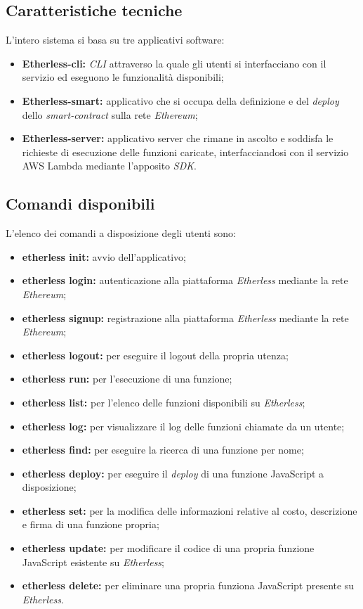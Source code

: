 \subsection{Caratteristiche tecniche}

L'intero sistema si basa su tre applicativi software:
	\begin{itemize}
		\item \textbf{Etherless-cli:} \textit{CLI\glo} attraverso la quale gli utenti si interfacciano con il servizio ed eseguono le funzionalità disponibili;
		\item \textbf{Etherless-smart:} applicativo che si occupa della definizione e del \textit{deploy\glo} dello \textit{smart-contract} sulla rete \textit{Ethereum\glos};
		\item \textbf{Etherless-server:} applicativo server che rimane in ascolto e soddisfa le richieste di esecuzione delle funzioni caricate, interfacciandosi con il servizio AWS Lambda mediante l'apposito \textit{SDK\glos}.
	\end{itemize}

\subsection{Comandi disponibili}
L'elenco dei comandi a disposizione degli utenti sono:
\begin{itemize}
	\item \textbf{etherless init:} avvio dell'applicativo;
	\item \textbf{etherless login:} autenticazione alla piattaforma \textit{Etherless} mediante la rete \textit{Ethereum\glos};
	\item \textbf{etherless signup:} registrazione alla piattaforma \textit{Etherless} mediante la rete \textit{Ethereum\glos};
	\item \textbf{etherless logout:} per eseguire il logout della propria utenza;
	\item \textbf{etherless run:} per l'esecuzione di una funzione;
	\item \textbf{etherless list:} per l'elenco delle funzioni disponibili su \textit{Etherless};
	\item \textbf{etherless log:} per visualizzare il log delle funzioni chiamate da un utente;
	\item \textbf{etherless find:} per eseguire la ricerca di una funzione per nome;
	\item \textbf{etherless deploy:} per eseguire il \textit{deploy\glo} di una funzione JavaScript a disposizione;
	\item \textbf{etherless set:} per la modifica delle informazioni relative al costo, descrizione e firma di una funzione propria;
	\item \textbf{etherless update:} per modificare il codice di una propria funzione JavaScript esistente su \textit{Etherless};
	\item \textbf{etherless delete:} per eliminare una propria funziona JavaScript presente su \textit{Etherless}.
\end{itemize}


